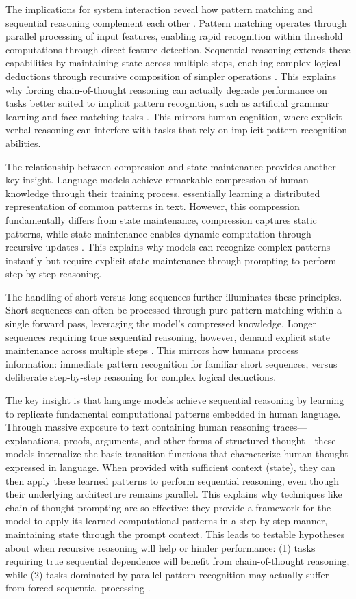 \documentclass[12pt]{article}
\begin{document}
The implications for system interaction reveal how pattern matching and sequential reasoning complement each other \cite{wei2022chain}.
Pattern matching operates through parallel processing of input features, enabling rapid recognition within threshold computations through direct feature detection.
Sequential reasoning extends these capabilities by maintaining state across multiple steps, enabling complex logical deductions through recursive composition of simpler operations \cite{dickson2024trust}.
This explains why forcing chain-of-thought reasoning can actually degrade performance on tasks better suited to implicit pattern recognition, such as artificial grammar learning and face matching tasks \cite{liu2024mind}.
This mirrors human cognition, where explicit verbal reasoning can interfere with tasks that rely on implicit pattern recognition abilities.

The relationship between compression and state maintenance provides another key insight.
Language models achieve remarkable compression of human knowledge through their training process, essentially learning a distributed representation of common patterns in text.
However, this compression fundamentally differs from state maintenance, compression captures static patterns, while state maintenance enables dynamic computation through recursive updates \cite{dickson2024trust}.
This explains why models can recognize complex patterns instantly but require explicit state maintenance through prompting to perform step-by-step reasoning.

The handling of short versus long sequences further illuminates these principles.
Short sequences can often be processed through pure pattern matching within a single forward pass, leveraging the model's compressed knowledge.
Longer sequences requiring true sequential reasoning, however, demand explicit state maintenance across multiple steps \cite{wei2022chain}.
This mirrors how humans process information: immediate pattern recognition for familiar short sequences, versus deliberate step-by-step reasoning for complex logical deductions.

The key insight is that language models achieve sequential reasoning by learning to replicate fundamental computational patterns embedded in human language.
Through massive exposure to text containing human reasoning traces---explanations, proofs, arguments, and other forms of structured thought---these models internalize the basic transition functions that characterize human thought expressed in language.
When provided with sufficient context (state), they can then apply these learned patterns to perform sequential reasoning, even though their underlying architecture remains parallel.
This explains why techniques like chain-of-thought prompting are so effective: they provide a framework for the model to apply its learned computational patterns in a step-by-step manner, maintaining state through the prompt context.
This leads to testable hypotheses about when recursive reasoning will help or hinder performance: (1) tasks requiring true sequential dependence will benefit from chain-of-thought reasoning, while (2) tasks dominated by parallel pattern recognition may actually suffer from forced sequential processing \cite{liu2024mind}.
\end{document}
